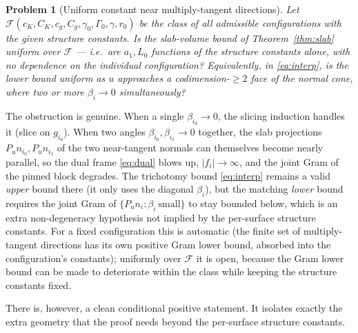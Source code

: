 \documentclass[11pt]{article}
\newtheorem{problem}[theorem]{Problem}
\begin{document}
\begin{problem}[Uniform constant near multiply-tangent directions]\label{prob:uniform}
Let $\mathcal F(c_K,C_K,c_g,C_g,\gamma_0,\Gamma_0,\gamma,r_0)$ be the class of
\emph{all} admissible configurations with the given structure constants.  Is the
slab-volume bound of Theorem~\ref{thm:slab} uniform over $\mathcal F$ --- i.e.\
are $a_1,L_0$ functions of the structure constants alone, with no dependence on
the individual configuration?  Equivalently, in \eqref{eq:interp}, is the
\emph{lower} bound uniform as $u$ approaches a codimension-$\ge2$ face of the
normal cone, where two or more $\beta_i\to0$ simultaneously?
\end{problem}

\noindent The obstruction is genuine.  When a single $\beta_{i_0}\to0$, the
slicing induction handles it (slice on $g_{i_0}$).  When two angles
$\beta_{i_0},\beta_{i_1}\to0$ together, the slab projections $P_un_{i_0},
P_un_{i_1}$ of the two near-tangent normals can themselves become nearly
parallel, so the dual frame \eqref{eq:dual} blows up, $|f_i|\to\infty$, and the
joint Gram of the pinned block degrades.  The trichotomy bound \eqref{eq:interp}
remains a valid \emph{upper} bound there (it only uses the diagonal $\beta_i$),
but the matching \emph{lower} bound requires the joint Gram of
$\{P_un_i:\beta_i\ \text{small}\}$ to stay bounded below, which is an extra
non-degeneracy hypothesis not implied by the per-surface structure constants.
For a fixed configuration this is automatic (the finite set of multiply-tangent
directions has its own positive Gram lower bound, absorbed into the
configuration's constants); uniformly over $\mathcal F$ it is open, because the
Gram lower bound can be made to deteriorate within the class while keeping the
structure constants fixed.

There is, however, a clean conditional positive statement.  It isolates exactly
the extra geometry that the proof needs beyond the per-surface structure
constants.
\end{document}

